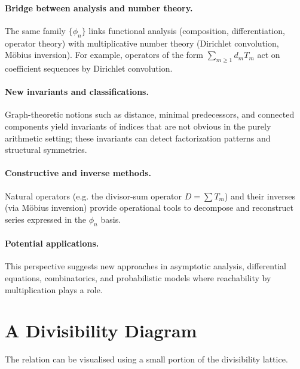 \paragraph{Bridge between analysis and number theory.}
The same family \(\{\phi_n\}\) links functional analysis (composition,
differentiation, operator theory) with multiplicative number theory
(Dirichlet convolution, Möbius inversion). For example, operators of the
form \(\sum_{m\ge1}d_mT_m\) act on coefficient sequences by Dirichlet
convolution.

\paragraph{New invariants and classifications.}
Graph-theoretic notions such as distance, minimal predecessors, and
connected components yield invariants of indices that are not obvious in
the purely arithmetic setting; these invariants can detect factorization
patterns and structural symmetries.

\paragraph{Constructive and inverse methods.}
Natural operators (e.g. the divisor-sum operator \(D=\sum T_m\)) and
their inverses (via Möbius inversion) provide operational tools to
decompose and reconstruct series expressed in the \(\phi_n\) basis.

\paragraph{Potential applications.}
This perspective suggests new approaches in asymptotic analysis,
differential equations, combinatorics, and probabilistic models where
reachability by multiplication plays a role.


\section{A Divisibility Diagram}

The relation can be visualised using a small portion of the
divisibility lattice.

